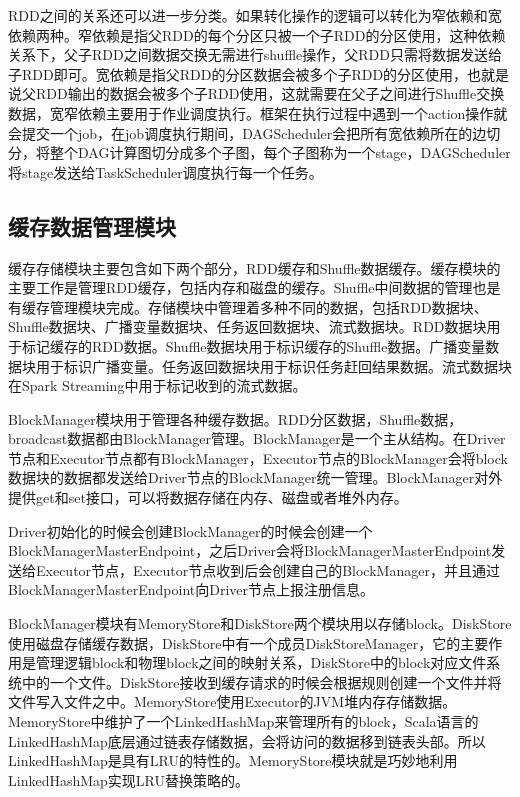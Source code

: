RDD之间的关系还可以进一步分类。如果转化操作的逻辑可以转化为窄依赖和宽依赖两种。窄依赖是指父RDD的每个分区只被一个子RDD的分区使用，这种依赖关系下，父子RDD之间数据交换无需进行shuffle操作，父RDD只需将数据发送给子RDD即可。宽依赖是指父RDD的分区数据会被多个子RDD的分区使用，也就是说父RDD输出的数据会被多个子RDD使用，这就需要在父子之间进行Shuffle交换数据，宽窄依赖主要用于作业调度执行。框架在执行过程中遇到一个action操作就会提交一个job，在job调度执行期间，DAGScheduler会把所有宽依赖所在的边切分，将整个DAG计算图切分成多个子图，每个子图称为一个stage，DAGScheduler将stage发送给TaskScheduler调度执行每一个任务。

\subsection{缓存数据管理模块}

缓存存储模块主要包含如下两个部分，RDD缓存和Shuffle数据缓存。缓存模块的主要工作是管理RDD缓存，包括内存和磁盘的缓存。Shuffle中间数据的管理也是有缓存管理模块完成。存储模块中管理着多种不同的数据，包括RDD数据块、Shuffle数据块、广播变量数据块、任务返回数据块、流式数据块。RDD数据块用于标记缓存的RDD数据。Shuffle数据块用于标识缓存的Shuffle数据。广播变量数据块用于标识广播变量。任务返回数据块用于标识任务赶回结果数据。流式数据块在Spark Streaming中用于标记收到的流式数据。

BlockManager模块用于管理各种缓存数据。RDD分区数据，Shuffle数据，broadcast数据都由BlockManager管理。BlockManager是一个主从结构。在Driver节点和Executor节点都有BlockManager，Executor节点的BlockManager会将block数据块的数据都发送给Driver节点的BlockManager统一管理。BlockManager对外提供get和set接口，可以将数据存储在内存、磁盘或者堆外内存。

Driver初始化的时候会创建BlockManager的时候会创建一个BlockManagerMasterEndpoint，之后Driver会将BlockManagerMasterEndpoint发送给Executor节点，Executor节点收到后会创建自己的BlockManager，并且通过BlockManagerMasterEndpoint向Driver节点上报注册信息。


BlockManager模块有MemoryStore和DiskStore两个模块用以存储block。DiskStore使用磁盘存储缓存数据，DiskStore中有一个成员DiskStoreManager，它的主要作用是管理逻辑block和物理block之间的映射关系，DiskStore中的block对应文件系统中的一个文件。DiskStore接收到缓存请求的时候会根据规则创建一个文件并将文件写入文件之中。MemoryStore使用Executor的JVM堆内存存储数据。MemoryStore中维护了一个LinkedHashMap来管理所有的block，Scala语言的LinkedHashMap底层通过链表存储数据，会将访问的数据移到链表头部。所以LinkedHashMap是具有LRU的特性的。MemoryStore模块就是巧妙地利用LinkedHashMap实现LRU替换策略的。

